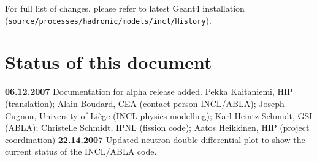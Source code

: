 
%

For full list of changes, please refer to latest Geant4 installation
({\tt source\-/processes\-/hadronic\-/models\-/incl\-/History}).

\section{Status of this document}

{\bf 06.12.2007} Documentation for alpha release added. Pekka
Kaitaniemi, HIP (translation); Alain Boudard, CEA (contact person
INCL/ABLA); Joseph Cugnon, University of Li\`ege (INCL physics
modelling); Karl-Heintz Schmidt, GSI (ABLA); Christelle Schmidt, IPNL
(fission code); Aatos Heikkinen, HIP (project coordination)
{\bf 22.14.2007} Updated neutron double-differential plot to show
the current status of the INCL/ABLA code.


